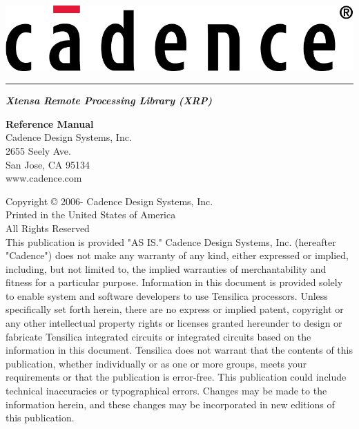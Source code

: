 \documentclass[twoside]{book}
\newcommand{\+}{\discretionary{\mbox{\scriptsize$\hookleftarrow$}}{}{}}
\begin{document}
\hypersetup{pageanchor=false,
             bookmarks=true,
             bookmarksnumbered=true,
             pdfencoding=unicode
            }
\begin{titlepage}
\vspace*{1.0in}
\includegraphics[scale=0.9]{Cadence_Logo_Red}
\vspace*{0.2in}
\hrule height0.5pt
\vspace*{0.5cm}
{\Huge\sl\bfseries Xtensa\raisebox{0.8ex}{\normalsize\textregistered} Remote Processing Library (XRP)}\\
\begin{flushright}
\vspace*{0.5cm}
{\Large\bfseries Reference Manual}\\
\vspace*{8.5cm}
Cadence Design Systems, Inc.\\
2655 Seely Ave.\\
San Jose, CA 95134\\
www.cadence.com\\
\end{flushright}
\newpage
\pagestyle{empty}
{\small
Copyright {\copyright} 2006-{\the\year} Cadence Design Systems, Inc.\\
Printed in the United States of America\\
All Rights Reserved\\
\vspace*{0.5cm}
\newline This publication is provided "AS IS." Cadence Design Systems, Inc. (hereafter "Cadence") does not make any warranty of any kind, either expressed or implied, including, but not limited to, the implied warranties of merchantability and fitness for a particular purpose. Information in this document is provided solely to enable system and software developers to use Tensilica processors. Unless specifically set forth herein, there are no express or implied patent, copyright or any other intellectual property rights or licenses granted hereunder to design or fabricate Tensilica integrated circuits or integrated circuits based on the information in this document. Tensilica does not warrant that the contents of this publication, whether individually or as one or more groups, meets your requirements or that the publication is error-free. This publication could include technical inaccuracies or typographical errors. Changes may be made to the information herein, and these changes may be incorporated in new editions of this publication.
}
\end{titlepage}
\end{document}
